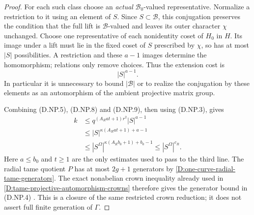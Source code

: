 \begin{proof}
For each such class choose an \emph{actual}
$\mathcal B_0$-valued representative. Normalize a
restriction to it using an element of $S$. Since
$S\subset\mathcal B$, this conjugation preserves the
condition that the full lift is $\mathcal B$-valued
and leaves its outer character $\chi$ unchanged.
Choose one representative of each nonidentity coset
of $H_0$ in $H$. Its image under a lift must lie in
the fixed coset of $S$ prescribed by $\chi$, so has
at most $|S|$ possibilities. A restriction and these
$a-1$ images determine the homomorphism; relations
only remove choices. Thus the extension cost is
\[
                              |S|^{a-1}.               \tag{D.NP.9}
\]
In particular it is unnecessary to bound $|\mathcal B|$
or to realize the conjugation by these elements as an
automorphism of the ambient projective matrix group.

Combining (D.NP.5), (D.NP.8) and (D.NP.9), then using
(D.NP.3), gives
\[
 \begin{split}
 k&\leq q^{(A_Rat+1)r^2}|S|^{a-1}\\
  &\leq |S|^{\kappa(A_Rat+1)+a-1}\\
  &\leq |S^\Omega|^{\kappa(A_Rb_0+1)+b_0-1}
   \leq |S^\Omega|^{c_R}.
 \end{split}                                           \tag{D.NP.10}
\]
Here $a\leq b_0$ and $t\geq1$ are the only estimates
used to pass to the third line. The radial tame
quotient $P$ has at most $2g+1$ generators by
\ref{D:one-curve-radial-tame-generators}. The exact
nonabelian crown inequality already used in
\ref{D:tame-projective-automorphism-crowns} therefore
gives the generator bound in (D.NP.4)
\citep[proof of Proposition2.6(ii), equations(2.1)--(2.2),
pp.~11--13]{LucchiniMarionTracey2020D}.
This is a closure of the same restricted crown reduction;
it does not assert full finite generation of $\Gamma$.
\end{proof}
